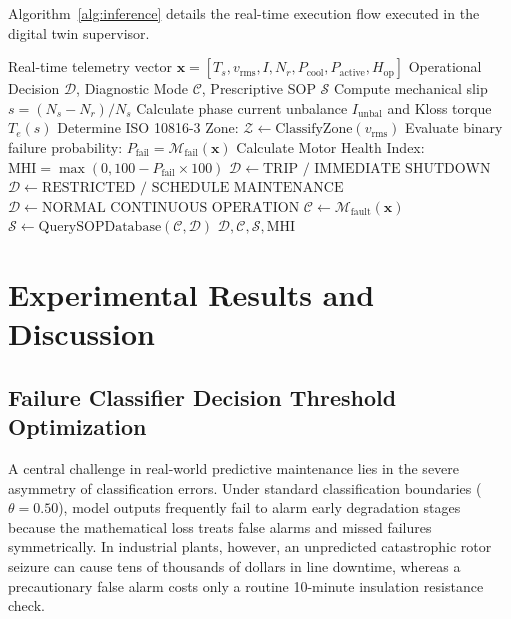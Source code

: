\documentclass[conference]{IEEEtran}
\begin{document}
Algorithm~\ref{alg:inference} details the real-time execution flow executed in the digital twin supervisor.

\begin{algorithm}[htbp]
\caption{Physics-Guided Dual-Stage Diagnostic Workflow}
\label{alg:inference}
\begin{algorithmic}[1]
\REQUIRE Real-time telemetry vector $\mathbf{x} = [T_s, v_{\text{rms}}, I, N_r, P_{\text{cool}}, P_{\text{active}}, H_{\text{op}}]$
\ENSURE Operational Decision $\mathcal{D}$, Diagnostic Mode $\mathcal{C}$, Prescriptive SOP $\mathcal{S}$
\STATE Compute mechanical slip $s = (N_s - N_r) / N_s$
\STATE Calculate phase current unbalance $I_{\text{unbal}}$ and Kloss torque $T_e(s)$
\STATE Determine ISO 10816-3 Zone: $\mathcal{Z} \leftarrow \text{ClassifyZone}(v_{\text{rms}})$
\STATE Evaluate binary failure probability: $P_{\text{fail}} = \mathcal{M}_{\text{fail}}(\mathbf{x})$
\STATE Calculate Motor Health Index: $\text{MHI} = \max(0, 100 - P_{\text{fail}} \times 100)$
    \STATE $\mathcal{D} \leftarrow \text{TRIP / IMMEDIATE SHUTDOWN}$
    \STATE $\mathcal{D} \leftarrow \text{RESTRICTED / SCHEDULE MAINTENANCE}$
\ELSE
    \STATE $\mathcal{D} \leftarrow \text{NORMAL CONTINUOUS OPERATION}$
\ENDIF
\STATE $\mathcal{C} \leftarrow \mathcal{M}_{\text{fault}}(\mathbf{x})$ 
\STATE $\mathcal{S} \leftarrow \text{QuerySOPDatabase}(\mathcal{C}, \mathcal{D})$
\RETURN $\mathcal{D}, \mathcal{C}, \mathcal{S}, \text{MHI}$
\end{algorithmic}
\end{algorithm}

\section{Experimental Results and Discussion}

\subsection{Failure Classifier Decision Threshold Optimization}
A central challenge in real-world predictive maintenance lies in the severe asymmetry of classification errors. Under standard classification boundaries ($\theta = 0.50$), model outputs frequently fail to alarm early degradation stages because the mathematical loss treats false alarms and missed failures symmetrically. In industrial plants, however, an unpredicted catastrophic rotor seizure can cause tens of thousands of dollars in line downtime, whereas a precautionary false alarm costs only a routine 10-minute insulation resistance check.
\end{document}

